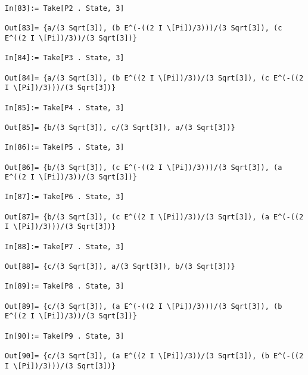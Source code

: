 \documentclass{article}
\theoremstyle{definition}
\begin{document}
\begin{lstlisting}
In[83]:= Take[P2 . State, 3]

Out[83]= {a/(3 Sqrt[3]), (b E^(-((2 I \[Pi])/3)))/(3 Sqrt[3]), (c E^((2 I \[Pi])/3))/(3 Sqrt[3])}

In[84]:= Take[P3 . State, 3]

Out[84]= {a/(3 Sqrt[3]), (b E^((2 I \[Pi])/3))/(3 Sqrt[3]), (c E^(-((2 I \[Pi])/3)))/(3 Sqrt[3])}

In[85]:= Take[P4 . State, 3]

Out[85]= {b/(3 Sqrt[3]), c/(3 Sqrt[3]), a/(3 Sqrt[3])}

In[86]:= Take[P5 . State, 3]

Out[86]= {b/(3 Sqrt[3]), (c E^(-((2 I \[Pi])/3)))/(3 Sqrt[3]), (a E^((2 I \[Pi])/3))/(3 Sqrt[3])}

In[87]:= Take[P6 . State, 3]

Out[87]= {b/(3 Sqrt[3]), (c E^((2 I \[Pi])/3))/(3 Sqrt[3]), (a E^(-((2 I \[Pi])/3)))/(3 Sqrt[3])}

In[88]:= Take[P7 . State, 3]

Out[88]= {c/(3 Sqrt[3]), a/(3 Sqrt[3]), b/(3 Sqrt[3])}

In[89]:= Take[P8 . State, 3]

Out[89]= {c/(3 Sqrt[3]), (a E^(-((2 I \[Pi])/3)))/(3 Sqrt[3]), (b E^((2 I \[Pi])/3))/(3 Sqrt[3])}

In[90]:= Take[P9 . State, 3]

Out[90]= {c/(3 Sqrt[3]), (a E^((2 I \[Pi])/3))/(3 Sqrt[3]), (b E^(-((2 I \[Pi])/3)))/(3 Sqrt[3])}
\end{lstlisting}
\end{document}
